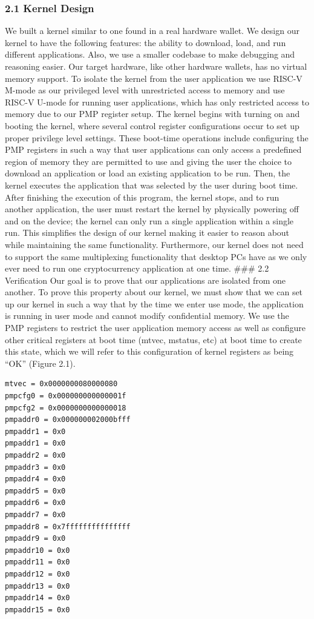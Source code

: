 \documentclass[]{article}
\begin{document}
\subsubsection{2.1 Kernel Design}\label{kernel-design}

We built a kernel similar to one found in a real hardware wallet. We
design our kernel to have the following features: the ability to
download, load, and run different applications. Also, we use a smaller
codebase to make debugging and reasoning easier. Our target hardware,
like other hardware wallets, has no virtual memory support. To isolate
the kernel from the user application we use RISC-V M-mode as our
privileged level with unrestricted access to memory and use RISC-V
U-mode for running user applications, which has only restricted access
to memory due to our PMP register setup. The kernel begins with turning
on and booting the kernel, where several control register configurations
occur to set up proper privilege level settings. These boot-time
operations include configuring the PMP registers in such a way that user
applications can only access a predefined region of memory they are
permitted to use and giving the user the choice to download an
application or load an existing application to be run. Then, the kernel
executes the application that was selected by the user during boot time.
After finishing the execution of this program, the kernel stops, and to
run another application, the user must restart the kernel by physically
powering off and on the device; the kernel can only run a single
application within a single run. This simplifies the design of our
kernel making it easier to reason about while maintaining the same
functionality. Furthermore, our kernel does not need to support the same
multiplexing functionality that desktop PCs have as we only ever need to
run one cryptocurrency application at one time. \#\#\# 2.2 Verification
Our goal is to prove that our applications are isolated from one
another. To prove this property about our kernel, we must show that we
can set up our kernel in such a way that by the time we enter use mode,
the application is running in user mode and cannot modify confidential
memory. We use the PMP registers to restrict the user application memory
access as well as configure other critical registers at boot time
(mtvec, mstatus, etc) at boot time to create this state, which we will
refer to this configuration of kernel registers as being ``OK'' (Figure
2.1).

\begin{verbatim}
mtvec = 0x0000000080000080
pmpcfg0 = 0x000000000000001f
pmpcfg2 = 0x0000000000000018
pmpaddr0 = 0x000000002000bfff
pmpaddr1 = 0x0
pmpaddr1 = 0x0
pmpaddr2 = 0x0
pmpaddr3 = 0x0
pmpaddr4 = 0x0
pmpaddr5 = 0x0
pmpaddr6 = 0x0
pmpaddr7 = 0x0
pmpaddr8 = 0x7fffffffffffffff
pmpaddr9 = 0x0
pmpaddr10 = 0x0
pmpaddr11 = 0x0
pmpaddr12 = 0x0
pmpaddr13 = 0x0
pmpaddr14 = 0x0
pmpaddr15 = 0x0
\end{verbatim}
\end{document}
